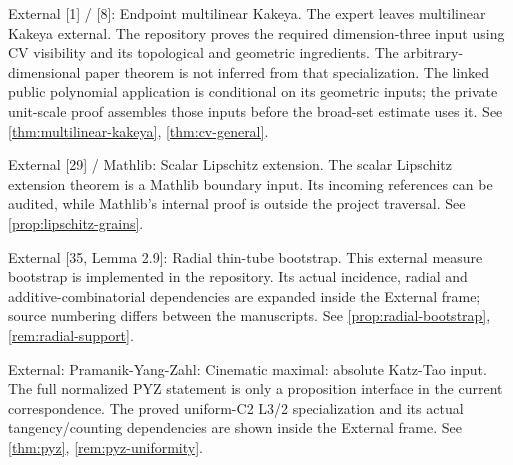 \begin{remark}
\label{rem:atlas-XBCT}
External [1] / [8]: Endpoint multilinear Kakeya.
The expert leaves multilinear Kakeya external. The repository proves the required dimension-three input using CV visibility and its topological and geometric ingredients. The arbitrary-dimensional paper theorem is not inferred from that specialization. The linked public polynomial application is conditional on its geometric inputs; the private unit-scale proof assembles those inputs before the broad-set estimate uses it.
See \ref{thm:multilinear-kakeya}, \ref{thm:cv-general}.
\end{remark}

\begin{remark}
\label{rem:atlas-XExt}
External [29] / Mathlib: Scalar Lipschitz extension.
The scalar Lipschitz extension theorem is a Mathlib boundary input. Its incoming references can be audited, while Mathlib's internal proof is outside the project traversal.
See \ref{prop:lipschitz-grains}.
\end{remark}

\begin{remark}
\label{rem:atlas-XOSW}
External [35, Lemma 2.9]: Radial thin-tube bootstrap.
This external measure bootstrap is implemented in the repository. Its actual incidence, radial and additive-combinatorial dependencies are expanded inside the External frame; source numbering differs between the manuscripts.
See \ref{prop:radial-bootstrap}, \ref{rem:radial-support}.
\end{remark}

\begin{remark}
\label{rem:atlas-XPYZ}
External: Pramanik-Yang-Zahl: Cinematic maximal: absolute Katz-Tao input.
The full normalized PYZ statement is only a proposition interface in the current correspondence. The proved uniform-C2 L3/2 specialization and its actual tangency/counting dependencies are shown inside the External frame.
See \ref{thm:pyz}, \ref{rem:pyz-uniformity}.
\end{remark}

